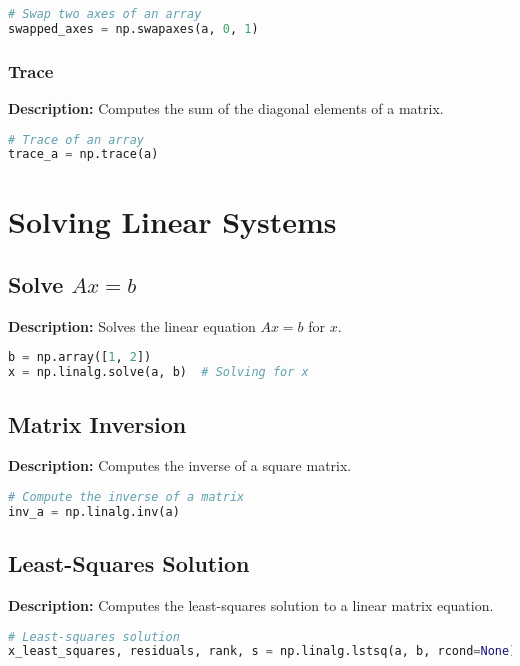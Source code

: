 \documentclass[a4paper, 12pt]{article}
\begin{document}
\begin{lstlisting}[language=Python]
# Swap two axes of an array
swapped_axes = np.swapaxes(a, 0, 1)
\end{lstlisting}

\subsubsection{Trace}
\textbf{Description:} Computes the sum of the diagonal elements of a matrix.

\begin{lstlisting}[language=Python]
# Trace of an array
trace_a = np.trace(a)
\end{lstlisting}

\section{Solving Linear Systems}

\subsection{Solve \(Ax = b\)}
\textbf{Description:} Solves the linear equation \(Ax = b\) for \(x\).

\begin{lstlisting}[language=Python]
b = np.array([1, 2])
x = np.linalg.solve(a, b)  # Solving for x
\end{lstlisting}

\subsection{Matrix Inversion}
\textbf{Description:} Computes the inverse of a square matrix.

\begin{lstlisting}[language=Python]
# Compute the inverse of a matrix
inv_a = np.linalg.inv(a)
\end{lstlisting}

\subsection{Least-Squares Solution}
\textbf{Description:} Computes the least-squares solution to a linear matrix equation.

\begin{lstlisting}[language=Python]
# Least-squares solution
x_least_squares, residuals, rank, s = np.linalg.lstsq(a, b, rcond=None)
\end{lstlisting}
\end{document}
